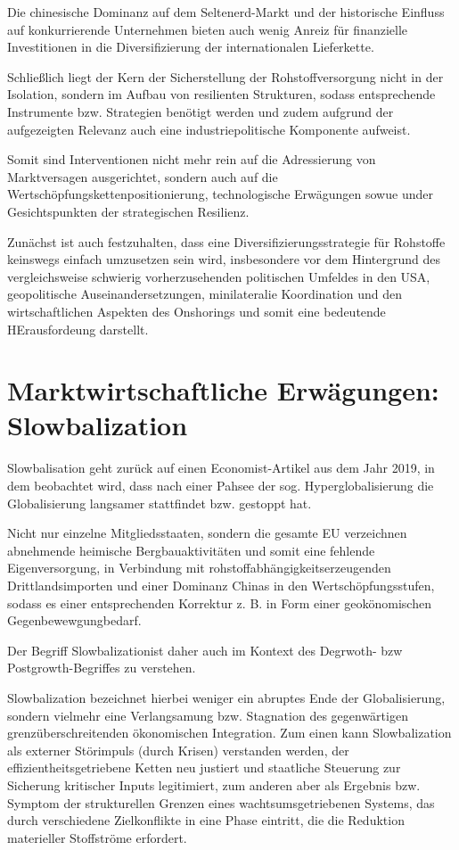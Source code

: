 \documentclass[12pt,a4paper,oneside]{book} %
\begin{document}
Die chinesische Dominanz auf dem Seltenerd-Markt und der historische Einfluss auf konkurrierende Unternehmen bieten auch wenig Anreiz für finanzielle Investitionen in die Diversifizierung der internationalen Lieferkette.

Schließlich liegt der Kern der Sicherstellung der Rohstoffversorgung nicht in der Isolation, sondern im Aufbau von resilienten Strukturen, sodass entsprechende Instrumente bzw. Strategien benötigt werden und zudem aufgrund der aufgezeigten Relevanz auch eine industriepolitische Komponente aufweist.

Somit sind Interventionen nicht mehr rein auf die Adressierung von Marktversagen ausgerichtet, sondern auch auf die Wertschöpfungskettenpositionierung, technologische Erwägungen sowue under Gesichtspunkten der strategischen Resilienz.\autocite{PE 786.415, S. 18}

Zunächst ist auch festzuhalten, dass eine Diversifizierungsstrategie für Rohstoffe keinswegs einfach umzusetzen sein wird, insbesondere vor dem Hintergrund des vergleichsweise schwierig vorherzusehenden politischen Umfeldes in den USA, geopolitische Auseinandersetzungen, minilateralie Koordination und den wirtschaftlichen Aspekten des Onshorings und somit eine bedeutende HErausfordeung darstellt.\autocite{McBridge, S. 31}


\section{Marktwirtschaftliche Erwägungen: Slowbalization}

Slowbalisation geht zurück auf einen Economist-Artikel aus dem Jahr 2019, in dem beobachtet wird, dass nach einer Pahsee der sog. Hyperglobalisierung die Globalisierung langsamer stattfindet bzw. gestoppt hat.

Nicht nur einzelne Mitgliedsstaaten, sondern die gesamte EU verzeichnen abnehmende heimische Bergbauaktivitäten und somit eine fehlende Eigenversorgung, in Verbindung mit rohstoffabhängigkeitserzeugenden Drittlandsimporten und einer Dominanz Chinas in den Wertschöpfungsstufen, sodass es einer entsprechenden Korrektur z. B. in Form einer \glqq geokönomischen Gegenbewewgung\grqq bedarf.\autocite{Frenz 2025, S. 316}

Der Begriff \glqq Slowbalization\grqq ist daher auch im Kontext des Degrwoth- bzw Postgrowth-Begriffes zu verstehen.

Slowbalization bezeichnet hierbei weniger ein abruptes Ende der Globalisierung, sondern vielmehr eine Verlangsamung bzw. Stagnation des gegenwärtigen grenzüberschreitenden ökonomischen Integration. Zum einen kann Slowbalization als externer Störimpuls (durch Krisen) verstanden werden, der effizientheitsgetriebene Ketten neu justiert und staatliche Steuerung zur Sicherung kritischer Inputs legitimiert, zum anderen aber als Ergebnis bzw. Symptom der strukturellen Grenzen eines wachtsumsgetriebenen Systems, das durch verschiedene Zielkonflikte in eine Phase eintritt, die die Reduktion materieller Stoffströme erfordert.
\end{document}
